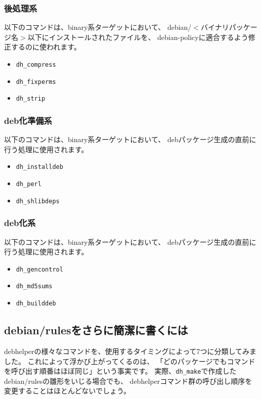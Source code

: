 \documentclass[mingoth,a4paper]{jsarticle}
\begin{document}
\subsubsection{後処理系}

以下のコマンドは、binary系ターゲットにおいて、
debian/$<$バイナリパッケージ名$>$以下にインストールされたファイルを、
debian-policyに適合するよう修正するのに使われます。

\begin{itemize}
 \item \texttt{dh\_compress}
 \item \texttt{dh\_fixperms}
 \item \texttt{dh\_strip}
\end{itemize}

\subsubsection{deb化準備系}

以下のコマンドは、binary系ターゲットにおいて、
debパッケージ生成の直前に行う処理に使用されます。

\begin{itemize}
 \item \texttt{dh\_installdeb}
 \item \texttt{dh\_perl}
 \item \texttt{dh\_shlibdeps}
\end{itemize}

\subsubsection{deb化系}

以下のコマンドは、binary系ターゲットにおいて、
debパッケージ生成の直前に行う処理に使用されます。

\begin{itemize}
 \item \texttt{dh\_gencontrol}
 \item \texttt{dh\_md5sums}
 \item \texttt{dh\_builddeb}
\end{itemize}

\subsection{debian/rulesをさらに簡潔に書くには}

debhelperの様々なコマンドを、使用するタイミングによって7つに分類してみました。
これによって浮かび上がってくるのは、
「どのパッケージでもコマンドを呼び出す順番はほぼ同じ」という事実です。
実際、\texttt{dh\_make}で作成したdebian/rulesの雛形をいじる場合でも、
debhelperコマンド群の呼び出し順序を変更することはほとんどないでしょう。
\end{document}
